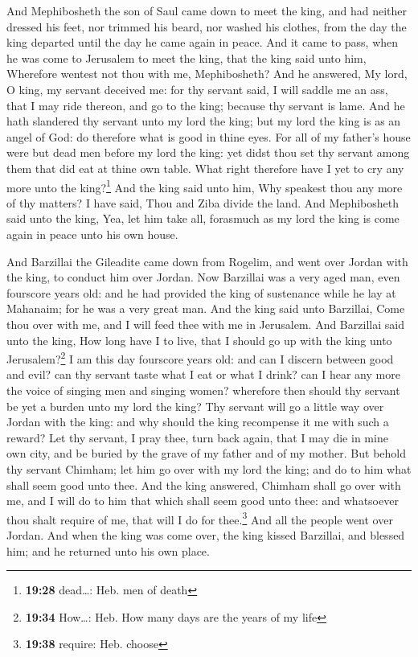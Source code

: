  And Mephibosheth the son of Saul came down to meet the
king, and had neither dressed his feet, nor trimmed his beard, nor
washed his clothes, from the day the king departed until the day he came
again in peace.  And it came to pass, when he was come to
Jerusalem to meet the king, that the king said unto him, Wherefore
wentest not thou with me, Mephibosheth?  And he answered,
My lord, O king, my servant deceived me: for thy servant said, I will
saddle me an ass, that I may ride thereon, and go to the king; because
thy servant is lame.  And he hath slandered thy servant
unto my lord the king; but my lord the king is as an angel of God: do
therefore what is good in thine eyes.  For all of my
father's house were but dead men before my lord the king: yet didst thou
set thy servant among them that did eat at thine own table. What right
therefore have I yet to cry any more unto the king?\footnote{\textbf{19:28}
  dead\ldots: Heb. men of death}  And the king said unto
him, Why speakest thou any more of thy matters? I have said, Thou and
Ziba divide the land.  And Mephibosheth said unto the
king, Yea, let him take all, forasmuch as my lord the king is come again
in peace unto his own house.

 And Barzillai the Gileadite came down from Rogelim, and
went over Jordan with the king, to conduct him over Jordan.
 Now Barzillai was a very aged man, even fourscore years
old: and he had provided the king of sustenance while he lay at
Mahanaim; for he was a very great man.  And the king said
unto Barzillai, Come thou over with me, and I will feed thee with me in
Jerusalem.  And Barzillai said unto the king, How long
have I to live, that I should go up with the king unto
Jerusalem?\footnote{\textbf{19:34} How\ldots: Heb. How many days are the
  years of my life}  I am this day fourscore years old:
and can I discern between good and evil? can thy servant taste what I
eat or what I drink? can I hear any more the voice of singing men and
singing women? wherefore then should thy servant be yet a burden unto my
lord the king?  Thy servant will go a little way over
Jordan with the king: and why should the king recompense it me with such
a reward?  Let thy servant, I pray thee, turn back again,
that I may die in mine own city, and be buried by the grave of my father
and of my mother. But behold thy servant Chimham; let him go over with
my lord the king; and do to him what shall seem good unto thee.
 And the king answered, Chimham shall go over with me,
and I will do to him that which shall seem good unto thee: and
whatsoever thou shalt require of me, that will I do for thee.\footnote{\textbf{19:38}
  require: Heb. choose}  And all the people went over
Jordan. And when the king was come over, the king kissed Barzillai, and
blessed him; and he returned unto his own place.

